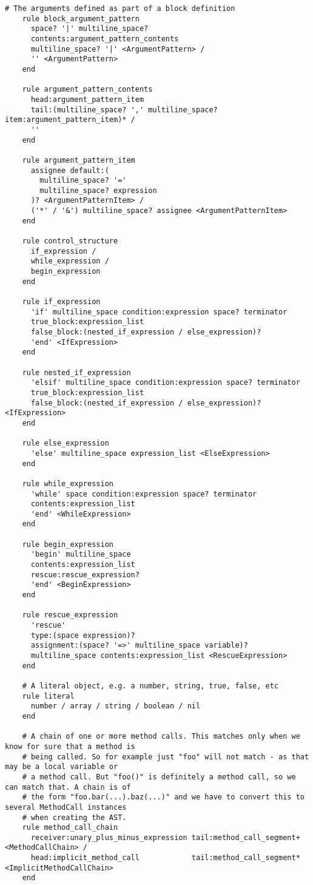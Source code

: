 \begin{lstlisting}[title={\small\ttfamily\bfseries parser/language.treetop},language=treetop]
    # The arguments defined as part of a block definition
    rule block_argument_pattern
      space? '|' multiline_space?
      contents:argument_pattern_contents
      multiline_space? '|' <ArgumentPattern> /
      '' <ArgumentPattern>
    end
    
    rule argument_pattern_contents
      head:argument_pattern_item
      tail:(multiline_space? ',' multiline_space? item:argument_pattern_item)* /
      ''
    end
    
    rule argument_pattern_item
      assignee default:(
        multiline_space? '='
        multiline_space? expression
      )? <ArgumentPatternItem> /
      ('*' / '&') multiline_space? assignee <ArgumentPatternItem>
    end
    
    rule control_structure
      if_expression /
      while_expression /
      begin_expression
    end
    
    rule if_expression
      'if' multiline_space condition:expression space? terminator
      true_block:expression_list
      false_block:(nested_if_expression / else_expression)?
      'end' <IfExpression>
    end
    
    rule nested_if_expression
      'elsif' multiline_space condition:expression space? terminator
      true_block:expression_list
      false_block:(nested_if_expression / else_expression)? <IfExpression>
    end
    
    rule else_expression
      'else' multiline_space expression_list <ElseExpression>
    end
    
    rule while_expression
      'while' space condition:expression space? terminator
      contents:expression_list
      'end' <WhileExpression>
    end
    
    rule begin_expression
      'begin' multiline_space
      contents:expression_list
      rescue:rescue_expression?
      'end' <BeginExpression>
    end
    
    rule rescue_expression
      'rescue'
      type:(space expression)?
      assignment:(space? '=>' multiline_space variable)?
      multiline_space contents:expression_list <RescueExpression>
    end
    
    # A literal object, e.g. a number, string, true, false, etc
    rule literal
      number / array / string / boolean / nil
    end
    
    # A chain of one or more method calls. This matches only when we know for sure that a method is
    # being called. So for example just "foo" will not match - as that may be a local variable or
    # a method call. But "foo()" is definitely a method call, so we can match that. A chain is of 
    # the form "foo.bar(...).baz(...)" and we have to convert this to several MethodCall instances
    # when creating the AST.
    rule method_call_chain
      receiver:unary_plus_minus_expression tail:method_call_segment+ <MethodCallChain> /
      head:implicit_method_call            tail:method_call_segment* <ImplicitMethodCallChain>
    end
    

\end{lstlisting}
